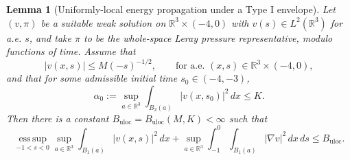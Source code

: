 \documentclass[11pt]{amsart}
\theoremstyle{plain}
\newtheorem{lemma}[lemma]{Lemma}
\theoremstyle{definition}
\theoremstyle{remark}
\numberwithin{equation}{section}
\begin{document}
\begin{lemma}[Uniformly-local energy propagation under a Type I envelope]
\label{p0:lem:uloc-typeI-propagation}
Let \((v,\pi)\) be a suitable weak solution on
\(\mathbb R^3\times(-4,0)\) with \(v(s)\in L^2(\mathbb R^3)\) for a.e.
\(s\), and take \(\pi\) to be the whole-space Leray pressure representative,
modulo functions of time.  Assume that
\begin{equation}\label{p0:eq:unit-typeI-envelope}
  |v(x,s)|\le M(-s)^{-1/2},
  \qquad \text{for a.e. }(x,s)\in\mathbb R^3\times(-4,0),
\end{equation}
and that for some admissible initial time \(s_0\in(-4,-3)\),
\begin{equation}\label{p0:eq:unit-uloc-initial}
  \alpha_0
  :=\sup_{a\in\mathbb R^3}\int_{B_2(a)} |v(x,s_0)|^2\,dx
  \le K .
\end{equation}
Then there is a constant \(B_{\mathrm{uloc}}=B_{\mathrm{uloc}}(M,K)<\infty\)
such that
\begin{equation}\label{p0:eq:unit-uloc-bound}
  \operatorname*{ess\,sup}_{-1<s<0}\sup_{a\in\mathbb R^3}
  \int_{B_1(a)} |v(x,s)|^2\,dx
  +
  \sup_{a\in\mathbb R^3}\int_{-1}^{0}\int_{B_1(a)}
  |\nabla v|^2\,dx\,ds
  \le B_{\mathrm{uloc}} .
\end{equation}
\end{lemma}
\end{document}
